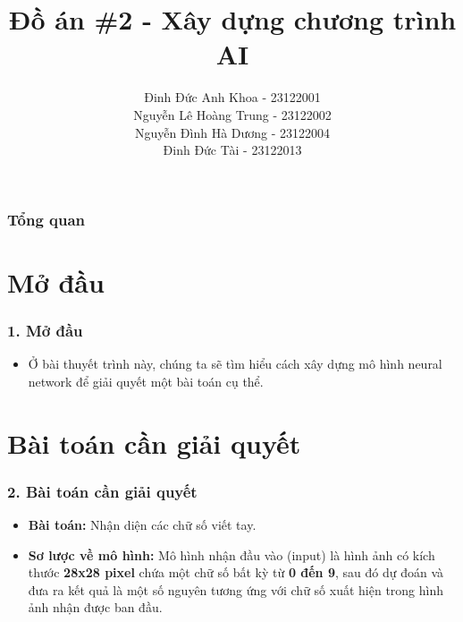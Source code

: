 \documentclass{beamer}
\title[Presentation ]{Đồ án \#2 - Xây dựng chương trình AI
} %
\author{ Đinh Đức Anh Khoa - 23122001 \\ Nguyễn Lê Hoàng Trung - 23122002 \\ Nguyễn Đình Hà Dương - 23122004 \\ Đinh Đức Tài - 23122013
} %
\institute[23TNT1] %
{
FIT@HCMUS \\ %
\medskip
\textit{TPHCM, tháng 1 năm 2024} %
}
\date{} %
\begin{document}
\begin{frame}
\titlepage %
\end{frame}

\begin{frame}
\frametitle{Tổng quan} %
\tableofcontents %
\end{frame}

\section{Mở đầu} 

\begin{frame}
\frametitle{1. Mở đầu}
\begin{itemize}
    \item Ở bài thuyết trình này, chúng ta sẽ tìm hiểu cách xây dựng mô hình neural network để giải quyết một bài toán cụ thể.
\end{itemize}
\end{frame}



\section{Bài toán cần giải quyết} 

\begin{frame}
\frametitle{2. Bài toán cần giải quyết}
\begin{itemize}
    \item \textbf{Bài toán:} Nhận diện các chữ số viết tay.
    \item \textbf{Sơ lược về mô hình:} Mô hình nhận đầu vào (input) là hình ảnh có kích thước \textbf{28x28 pixel} chứa một chữ số bất kỳ từ \textbf{0 đến 9}, sau đó dự đoán và đưa ra kết quả là một số nguyên tương ứng với chữ số xuất hiện trong hình ảnh nhận được ban đầu.
\end{itemize}
\end{frame}
\end{document}

